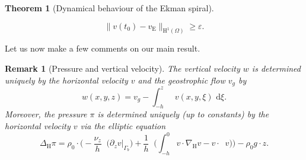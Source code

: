 \documentclass[preprint]{elsarticle}
\newtheorem{thm}{Theorem}[section]
\newtheorem{rem}[rem]{Remark}
\numberwithin{equation}{section}
\newcommand {\R}	{\mathbb{R}}
\renewcommand{\d}{\, \mathrm{d}}
\DeclareMathOperator{\divH}{div_{\H}}
\renewcommand{\H}{\mathrm{H}}
\newcommand{\sigmabar}{\bar{\sigma}}
\newcommand{\dk}[1]{\partial_{#1}}
\newcommand{\dz}{\dk{z}}
\renewcommand{\bar}[1]{\overline{#1}}
\newcommand{\nablaH}{\nabla_{\H}}
\newcommand{\DeltaH}{\Delta_{\H}}
\newcommand{\rL}{\mathrm{L}}
\newcommand{\rH}{\H}
\newcommand{\rE}{\mathrm{E}}
\begin{document}
\begin{thm}[Dynamical behaviour of the Ekman spiral]
\begin{enumerate}[(a)]
		\begin{equation*}
			\| v(t_0) - v_{\rE} \|_{\rH^1(\Omega)} \geq \varepsilon . 
		\end{equation*}
	\end{enumerate}	
\end{thm}

Let us now make a few comments on our main result. 

\begin{rem}[Pressure and vertical velocity]\label{rem:w_2}
	The vertical velocity $w$ is determined uniquely by the horizontal velocity $v$ and the geostrophic flow $v_g$ by
	\begin{equation*}
		w(x,y,z)
		= v_g - \int_{-h}^z \divH v(x,y,\xi) \, \d \xi . 
	\end{equation*}
	Moreover, the pressure $\pi$ is determined uniquely (up to constants) by the horizontal velocity $v$ via the elliptic equation
	\begin{equation*}
		\DeltaH \pi 
		= \rho_0 \cdot \biggl(
		-\frac{\nu_z}{h} \divH \bigl(\dz v\big|_{\Gamma_b}\bigr)
		+ \frac{1}{h} \divH \biggl(
		\int_{-h}^0 v \cdot \nablaH v - v \cdot \divH v
		\biggr)
		\biggr) - \rho_0 g \cdot z .
	\end{equation*}
\end{rem}
\end{document}
